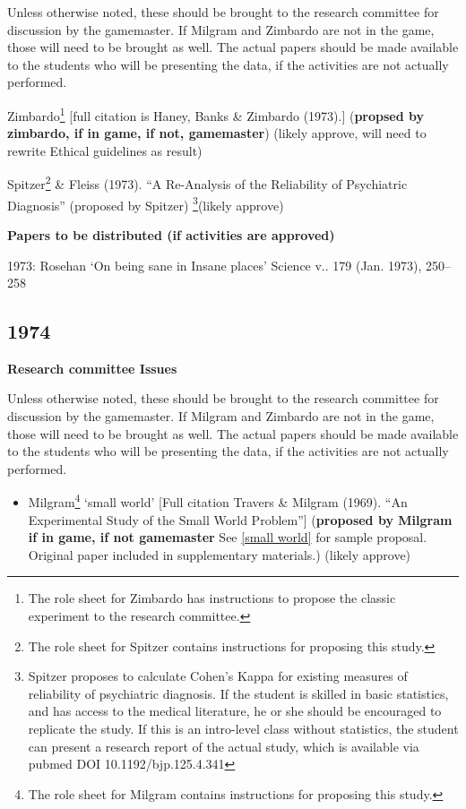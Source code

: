 Unless otherwise noted, these should be brought to the research committee for discussion by the gamemaster. If Milgram and Zimbardo are not in the game, those will need to be brought as well. The actual papers should be made available to the students who will be presenting the data, if the activities are not actually performed.

Zimbardo\footnote{The role sheet for Zimbardo has instructions to propose the classic experiment to the research committee.} [full citation is Haney, Banks \& Zimbardo (1973).] (\textbf{propsed by zimbardo, if in game, if not, gamemaster}) (likely approve, will need to rewrite Ethical guidelines as result) 

Spitzer\footnote{The role sheet for Spitzer contains instructions for proposing this study.} \& Fleiss (1973). ``A Re-Analysis of the Reliability of Psychiatric Diagnosis'' (proposed by Spitzer) \footnote{Spitzer proposes to calculate Cohen's Kappa for existing measures of reliability of psychiatric diagnosis. If the student is skilled in basic statistics, and has access to the medical literature, he or she should be encouraged to replicate the study. If this is an intro-level class without statistics, the student can present a research report of the actual study, which is available via pubmed DOI 10.1192\slash bjp.125.4.341}(likely approve)

\textbf{Papers to be distributed (if activities are approved)}

1973: Rosehan `On being sane in Insane places' Science v.. 179 (Jan. 1973), 250--258

\newpage

\subsection{1974}
\label{1974}

\textbf{Research committee Issues}

Unless otherwise noted, these should be brought to the research committee for discussion by the gamemaster. If Milgram and Zimbardo are not in the game, those will need to be brought as well. The actual papers should be made available to the students who will be presenting the data, if the activities are not actually performed.

\begin{itemize}
\item Milgram\footnote{The role sheet for Milgram contains instructions for proposing this study.} `small world' [Full citation Travers \& Milgram (1969). ``An Experimental Study of the Small World Problem''] (\textbf{proposed by Milgram if in game, if not gamemaster} See \ref{small world} for sample proposal. Original paper included in supplementary materials.) (likely approve)

\end{itemize}

